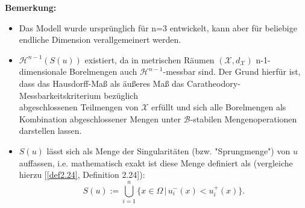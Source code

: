 \textbf{Bemerkung:} \begin{itemize}
\item Das Modell wurde ursprünglich für n=3 entwickelt, kann aber für beliebige endliche Dimension verallgemeinert werden.
\item \(\mathcal{H}^{n-1}(S(u))\) existiert, da in metrischen Räumen \((\mathcal{X},d_{\mathcal{X}})\) n-1-dimensionale Borelmengen auch \(\mathcal{H}^{n-1}\)-messbar sind. Der Grund hierfür ist, dass das Hausdorff-Maß als äußeres Maß das Caratheodory-Messbarkeitskriterium bezüglich \\ abgeschlossenen Teilmengen von \(\mathcal{X}\) erfüllt und sich alle Borelmengen als Kombination abgeschlossener Mengen unter \(\mathcal{B}\)-stabilen Mengenoperationen darstellen lassen.
\item \(S(u)\) lässt sich als Menge der Singularitäten (bzw. "Sprungmenge") von \(u\) auffassen, i.e. mathematisch exakt ist diese Menge definiert als (vergleiche hierzu [\ref{def2.24}, Definition 2.24]):
\begin{equation}
    S(u) := \bigcup_{i=1}^n \{x \in \Omega \, | \, u^-_i(x) < u^+_i(x)\}.
\end{equation}
\end{itemize}

